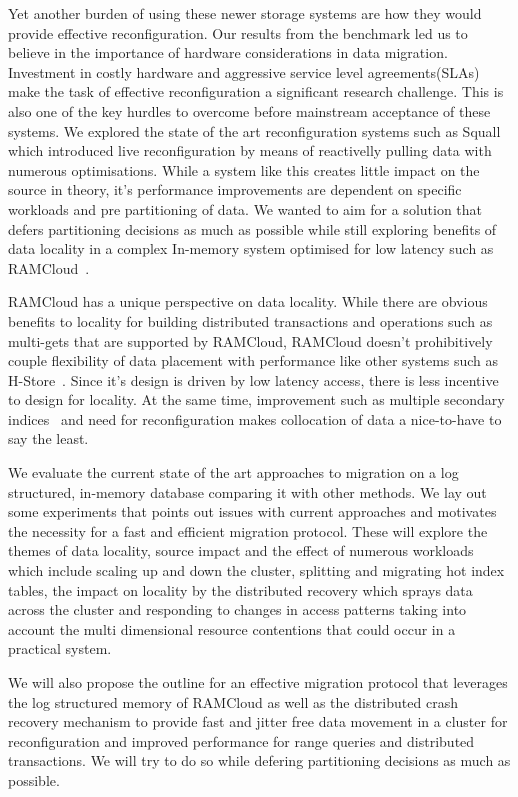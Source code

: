 Yet another burden of using these newer storage systems are how they would provide effective 
reconfiguration. Our results from the benchmark led us to believe in the importance of 
hardware considerations in data migration. Investment in costly hardware and aggressive
service level agreements(SLAs) make the task of effective reconfiguration a significant research challenge. 
This is also one of the key hurdles to overcome before mainstream acceptance of these systems.
We explored the state of the art reconfiguration systems such as Squall~\cite{squall} which 
introduced live reconfiguration by means of reactivelly pulling data with numerous optimisations.
While a system like this creates little impact on the source in theory, it's performance improvements
are dependent on specific workloads and pre partitioning of data. We wanted to aim for a solution that defers 
partitioning decisions as much as possible while still exploring benefits of data locality in a complex
In-memory system optimised for low latency such as RAMCloud~\cite{ramcloud}.


RAMCloud has a unique perspective on data locality. While there are obvious benefits to locality
for building distributed transactions and operations such as multi-gets that are supported by 
RAMCloud, RAMCloud doesn't prohibitively couple flexibility of data placement with performance like other systems 
such as H-Store~\cite{hstore}. Since it's design is driven by low latency access, there is less incentive
to design for locality. At the same time, improvement such as multiple secondary indices~\cite{slik} and need for reconfiguration 
makes collocation of data a nice-to-have to say the least. 

We evaluate the current state of the art approaches to migration on a log structured,
in-memory database comparing it with other methods. We lay out some experiments
that points out issues with current approaches and motivates the necessity 
for a fast and efficient migration protocol. These will explore the themes of data locality,
source impact and the effect of numerous workloads which include scaling up and down the cluster, splitting
and migrating hot index tables, the impact on locality by the distributed recovery which sprays data across the 
cluster and responding to changes in access patterns taking into account the multi dimensional resource contentions
that could occur in a practical system.

We will also propose the outline for an effective migration protocol that leverages
the log structured memory of RAMCloud as well as the distributed crash recovery mechanism
to provide fast and jitter free data movement in a cluster for reconfiguration and improved 
performance for range queries and distributed transactions. We will try to do so while
defering partitioning decisions as much as possible.

